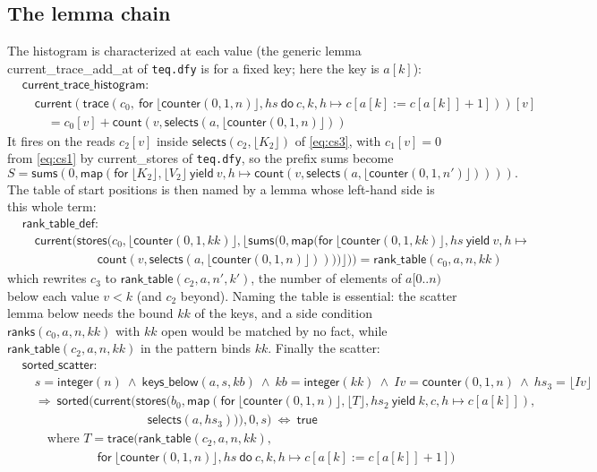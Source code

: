 \documentclass[11pt,a4paper]{article}
\newcommand{\bl}[1]{\lfloor #1\rfloor}                       %
\newcommand{\tr}[3]{\mathsf{trace}(#1,\ \mathsf{for}\ #2\ \mathsf{do}\ #3)}
\newcommand{\mapc}[2]{\mathsf{map}(\mathsf{for}\ #1\ \mathsf{yield}\ #2)}
\newcommand{\cnt}{\mathsf{counter}}
\newcommand{\cur}{\mathsf{current}}
\newcommand{\intf}{\mathsf{integer}}
\newcommand{\sums}{\mathsf{sums}}
\newcommand{\sorted}{\mathsf{sorted}}
\newcommand{\lemma}[1]{\textsf{#1}}
\begin{document}
\subsection{The lemma chain}
The histogram is characterized at each value (the generic lemma \lemma{current\_trace\_add\_at} of
\texttt{teq.dfy} is for a fixed key; here the key is $a[k]$):
\begin{align*}
  &\lemma{current\_trace\_histogram}:\\
  &\quad \cur(\tr{c_0}{\bl{\cnt(0, 1, n)}, hs}{c, k, h \mapsto c[a[k] := c[a[k]] + 1]})[v]\\
  &\qquad = c_0[v] + \mathsf{count}(v, \mathsf{selects}(a, \bl{\cnt(0, 1, n)}))
\end{align*}
It fires on the reads $c_2[v]$ inside $\mathsf{selects}(c_2, \bl{K_2})$ of \eqref{eq:cs3}, with
$c_1[v] = 0$ from \eqref{eq:cs1} by \lemma{current\_stores} of \texttt{teq.dfy}, so the prefix sums
become
\[ S = \sums(0, \mapc{\bl{K_2}, \bl{V_2}}{v, h \mapsto \mathsf{count}(v, \mathsf{selects}(a, \bl{\cnt(0, 1, n')}))}). \]
The table of start positions is then named by a lemma whose left-hand side is this whole term:
\begin{align*}
  &\lemma{rank\_table\_def}:\\
  &\quad \cur(\mathsf{stores}(c_0, \bl{\cnt(0, 1, kk)}, \bl{\sums(0, \mapc{\bl{\cnt(0, 1, kk)}, hs}{v, h \mapsto {}\\
  &\qquad\qquad\qquad \mathsf{count}(v, \mathsf{selects}(a, \bl{\cnt(0, 1, n)}))})}))
    = \mathsf{rank\_table}(c_0, a, n, kk)
\end{align*}
which rewrites $c_3$ to $\mathsf{rank\_table}(c_2, a, n', k')$, the number of elements of $a[0..n)$ below
each value $v < k$ (and $c_2$ beyond). Naming the table is essential: the scatter lemma below needs the
bound $kk$ of the keys, and a side condition $\mathsf{ranks}(c_0, a, n, kk)$ with $kk$ open would be
matched by no fact, while $\mathsf{rank\_table}(c_2, a, n, kk)$ in the pattern binds $kk$. Finally the
scatter:
\begin{align*}
  &\lemma{sorted\_scatter}:\\
  &\quad s = \intf(n)\ \wedge\ \mathsf{keys\_below}(a, s, kb)\ \wedge\ kb = \intf(kk)
    \ \wedge\ Iv = \cnt(0, 1, n)\ \wedge\ hs_3 = \bl{Iv}\\
  &\quad\Longrightarrow\ \sorted(\cur(\mathsf{stores}(b_0,
    \mapc{\bl{\cnt(0, 1, n)}, \bl{T}, hs_2}{k, c, h \mapsto c[a[k]]},\\
  &\qquad\qquad\qquad\qquad\qquad \mathsf{selects}(a, hs_3))), 0, s)\ \Longleftrightarrow\ \mathsf{true}\\
  &\qquad \text{where } T = \mathsf{trace}(\mathsf{rank\_table}(c_2, a, n, kk),\\
  &\qquad\qquad\qquad \mathsf{for}\ \bl{\cnt(0, 1, n)}, hs\ \mathsf{do}\ c, k, h \mapsto c[a[k] := c[a[k]] + 1])
\end{align*}
\end{document}
